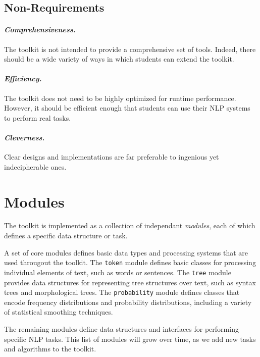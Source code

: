 \documentclass[11pt]{article}
\begin{document}
\subsection{Non-Requirements}

\paragraph{\textit{Comprehensiveness.}} The toolkit is not intended to
provide a comprehensive set of tools.  Indeed, there should be a wide
variety of ways in which students can extend the toolkit.

\paragraph{\textit{Efficiency.}} The toolkit does not need to be highly
optimized for runtime performance.  However, it should be efficient
enough that students can use their NLP systems to perform real tasks.

\paragraph{\textit{Cleverness.}} Clear designs and implementations are
far preferable to ingenious yet indecipherable ones.

\section{Modules}
\label{sec:modules}

The toolkit is implemented as a collection of independant
\emph{modules}, each of which defines a specific data structure or
task.  

A set of core modules defines basic data types and processing systems
that are used througout the toolkit.  The \texttt{token} module
defines basic classes for processing individual elements of text, such
as words or sentences.  The \texttt{tree} module provides data
structures for representing tree structures over text, such as syntax
trees and morphological trees.  The \texttt{probability} module
defines classes that encode frequency distributions and probability
distributions, including a variety of statistical smoothing
techniques.

The remaining modules define data structures and interfaces for
performing specific NLP tasks.  This list of modules will grow over
time, as we add new tasks and algorithms to the toolkit.
\end{document}
